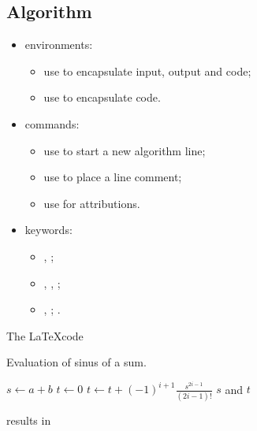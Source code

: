\documentclass[report,english]{enacom}
\begin{document}
\subsection{Algorithm}
	\begin{itemize}
		\item environments:
		\begin{itemize}
			\item use  to encapsulate input, output and code;
			\item use  to encapsulate code.
		\end{itemize}
		\item commands:
		\begin{itemize}
			\item use  to start a new algorithm line;
			\item use  to place a line comment;
			\item use  for attributions.
		\end{itemize}
		\item keywords:
		\begin{itemize}
			\item {}, ;
			\item {}, , ;
			\item {}, ;
            .
		\end{itemize}
	\end{itemize}
    The \LaTeX code
	\begin{lcode}
	\begin{algorithm}
		\caption{Evaluation of sinus of a sum.}
		\label{alg.Sinus}
        \begin{algorithmic}[1]
        \State $s \gets a + b$ 
        \State $t \gets 0$
    	    \State $t \gets t + (-1)^{i+1}\frac{s^{2i-1}}{(2i-1)!}$ 
        \EndFor
        \State \Return $s$ and $t$
        \end{algorithmic}
	\end{algorithm}
	\end{lcode}
    results in
\end{document}
